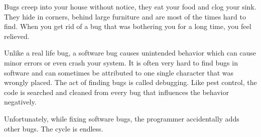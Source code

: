 
Bugs creep into your house without notice, they eat your food and clog your sink. 
They hide in corners, behind large furniture and are most of the times hard to find. When you get rid of a bug that was bothering you for a long time, you feel relieved.

Unlike a real life bug, a software bug causes unintended behavior which can cause minor errors or even crash your system. It is often very hard to find bugs in software and can sometimes be attributed to one single character that was wrongly placed. The act of finding bugs is called debugging. Like pest control, the code is searched and cleaned from every bug that influences the behavior negatively.

Unfortunately, while fixing software bugs, the programmer accidentally adds other bugs. The cycle is endless.

